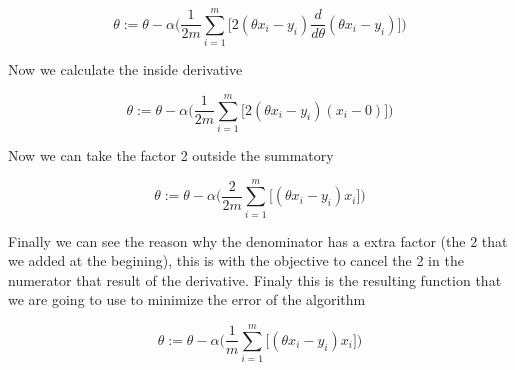 \documentclass[12pt,journal]{IEEEtran}
\begin{document}
    \begin{equation}
        \theta := \theta - \alpha
            \Bigg(
                \frac{1}{2m} \sum_{i=1}^{m}
                    \Bigg[
                        2(\theta x_i - y_i) \frac{d}{d \theta}(\theta x_i - y_i)
                    \Bigg]
            \Bigg)
    \end{equation}

    Now we calculate the inside derivative

    \begin{equation}
        \theta := \theta - \alpha
            \Bigg(
                \frac{1}{2m} \sum_{i=1}^{m}
                    \Big[
                        2 (\theta x_i - y_i) (x_i - 0)
                    \Big]
            \Bigg)
    \end{equation}

    Now we can take the factor 2 outside the summatory

    \begin{equation}
        \theta := \theta - \alpha
            \Bigg(
                \frac{2}{2m} \sum_{i=1}^{m}
                    \Big[
                        (\theta x_i - y_i) x_i
                    \Big]
            \Bigg)
    \end{equation}

    Finally we can see the reason why the denominator has a extra factor
    (the 2 that we added at the begining), this is with the objective
    to cancel the 2 in the numerator that result of the derivative. Finaly
    this is the resulting function that we are going to use to minimize the
    error of the algorithm

    \begin{equation}
        \theta := \theta - \alpha
            \Bigg(
                \frac{1}{m} \sum_{i=1}^{m}
                    \Big[
                        (\theta x_i - y_i) x_i
                    \Big]
            \Bigg)
    \end{equation}
\end{document}

